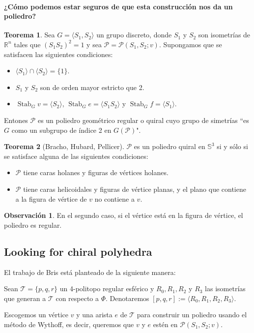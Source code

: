 \documentclass[spanish]{article}
\theoremstyle{definition}
\newtheorem*{obs}{Observación}
\newtheorem*{teo}{Teorema}
\newcommand{\R}{\mathbb{R}}
\newcommand{\s}{\mathbb{S}}
\newcommand{\p}{\mathcal{P}}
\newcommand{\T}{\mathcal{T}}
\DeclareMathOperator{\Stab}{Stab}
\begin{document}
\paragraph{¿Cómo podemos estar seguros de que esta construcción nos da un poliedro?}
\begin{teo}\label{teo:bris1}
	Sea $G=\langle S_1,S_2\rangle$ un grupo discreto, donde $S_1$ y $S_2$ son isometrías de $\R^n$ tales que $(S_1S_2)^2=1$ y sea $\p=\p(S_1,S_2;v)$. Supongamos que se satisfacen las siguientes condiciones:
	\begin{itemize}
		\item $\langle S_1\rangle\cap\langle S_2\rangle=\{1\}$.
		\item $S_1$ y $S_2$ son de orden mayor estricto que 2.
		\item $\Stab_G v=\langle S_2\rangle$, $\Stab_G e=\langle S_1S_2\rangle$ y $\Stab_G f=\langle S_1\rangle$.
	\end{itemize}
	Entones $\p$ es un poliedro geométrico regular o quiral cuyo grupo de simetrías ``es $G$ como un subgrupo de índice 2 en $G(\p)$".
\end{teo}

\begin{teo}[Bracho, Hubard, Pellicer]
	$\p$ es un poliedro quiral en $\s^3$ si y sólo si se satisface alguna de las siguientes condiciones:
	\begin{itemize}
		\item $\p$ tiene caras holanes y figuras de vértices holanes.
		\item $\p$ tiene caras helicoidales y figuras de vértice planas, y el plano que contiene a la figura de vértice de $v$ no contiene a $v$.
	\end{itemize}
\end{teo}
\begin{obs}
	En el segundo caso, si el vértice está en la figura de vértice, el poliedro es regular.
\end{obs}

\subsection{Looking for chiral polyhedra}
El trabajo de Bris está planteado de la siguiente manera:

Sean $\T=\{p,q,r\}$ un 4-politopo regular esférico y $R_0,R_1,R_2$ y $R_3$ las isometrías que generan a $\T$ con respecto a $\Phi$. Denotaremos $[p,q,r]:=\langle R_0,R_1,R_2,R_3\rangle$.

Escogemos un vértice $v$ y una arista $e$ de $\T$ para construir un poliedro usando el método de Wythoff, es decir, queremos que $v$ y $e$ estén en $\p(S_1,S_2;v)$.
\end{document}
